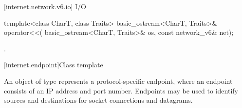 [internet.network.v6.io]{ I/O}

\begin{itemdecl}
template<class CharT, class Traits>
  basic_ostream<CharT, Traits>& operator<<(
    basic_ostream<CharT, Traits>& os, const network_v6& net);
\end{itemdecl}

\begin{itemdescr}
\pnum
\returns {}.
\end{itemdescr}




[internet.endpoint]{Class template }

\pnum
An object of type  represents a protocol-specific endpoint, where an endpoint consists of an IP address and port number. Endpoints may be used to identify sources and destinations for socket connections and datagrams.

